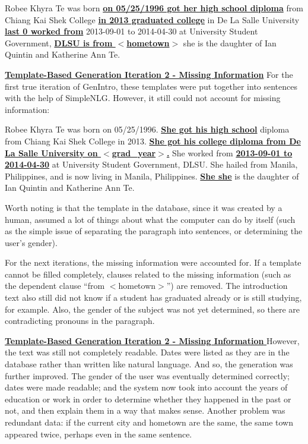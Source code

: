\begin{center} Robee Khyra Te was born \underline{\textbf{on 05/25/1996 got her high school diploma}} from Chiang Kai Shek College \underline{\textbf{in 2013 graduated college}}  in De La Salle University \underline{\textbf{last 0 worked from}} 2013-09-01 to 2014-04-30 at University Student Government, \underline{\textbf{DLSU is from $<$hometown$>$}} she is the daughter of Ian Quintin and Katherine Ann Te.
 \end{center}

\underline{\textbf{Template-Based Generation Iteration 2 - Missing Information}}
For the first true iteration of GenIntro, these templates were put together into sentences with the help of SimpleNLG. However, it still could not account for missing information:

\begin{center} Robee Khyra Te was born on 05/25/1996. \underline{\textbf{She got his high school}} diploma from Chiang Kai Shek College in 2013. \underline{\textbf{She got his college diploma from De La Salle University on $<$grad\_year$>$.}} She worked from \underline{\textbf{2013-09-01 to 2014-04-30}} at University Student Government, DLSU. She hailed from Manila, Philippines, and is now living in Manila, Philippines. \underline{\textbf{She she}} is the daughter of Ian Quintin and Katherine Ann Te.
 \end{center}

Worth noting is that the template in the database, since it was created by a human, assumed a lot of things about what the computer can do by itself (such as the simple issue of separating the paragraph into sentences, or determining the user's gender). 

For the next iterations, the missing information were accounted for. If a template cannot be filled completely, clauses related to the missing information (such as the dependent clause ``from $<$hometown$>$'') are removed. The introduction text also still did not know if a student has graduated already or is still studying, for example. Also, the gender of the subject was not yet determined, so there are contradicting pronouns in the paragraph.

\underline{\textbf{\underline{\textbf{Template-Based Generation Iteration 2 - Missing Information}} \newline}} \newline
However, the text was still not completely readable. Dates were listed as they are in the database rather than written like natural language. And so, the generation was further improved. The gender of the user was eventually determined correctly; dates were made readable; and the system now took into account the years of education or work in order to determine whether they happened in the past or not, and then explain them in a way that makes sense. Another problem was redundant data: if the current city and hometown are the same, the same town appeared twice, perhaps even in the same sentence.

